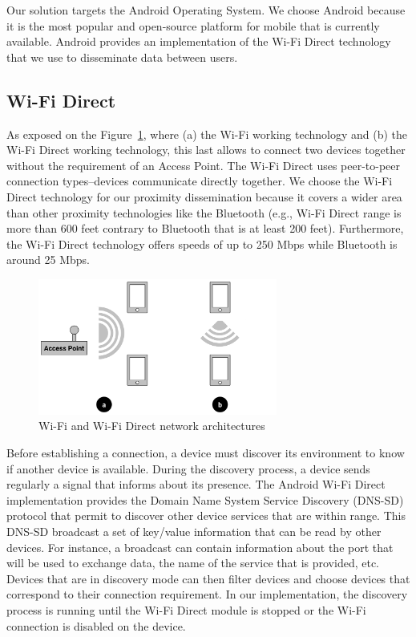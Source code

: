 

Our solution targets the Android Operating System.
We choose Android because it is the most popular and open-source platform for mobile that is currently available.
Android provides an implementation of the Wi-Fi Direct technology that we use to disseminate data between users.

\subsection{Wi-Fi Direct}

As exposed on the Figure~\ref{WiFiVsWiFiDi}, where (a) the Wi-Fi working technology and (b) the Wi-Fi Direct working technology, this last allows to connect two devices together without the requirement of an Access Point.
The Wi-Fi Direct uses peer-to-peer connection types--devices communicate directly together.
We choose the Wi-Fi Direct technology for our proximity dissemination because it covers a wider area than other proximity technologies like the Bluetooth (e.g., Wi-Fi Direct range is more than 600 feet contrary to Bluetooth that is at least 200 feet).
Furthermore, the Wi-Fi Direct technology offers speeds of up to 250 Mbps while Bluetooth is around 25 Mbps.

\begin{figure}[h]
	\centering
	\includegraphics[width=0.7\textwidth]{figures/wifivswifidirect}
	\caption{\label{WiFiVsWiFiDi}Wi-Fi and Wi-Fi Direct network architectures}
\end{figure}

Before establishing a connection, a device must discover its environment to know if another device is available.
During the discovery process, a device sends regularly a signal that informs about its presence.
The Android Wi-Fi Direct implementation provides the Domain Name System Service Discovery (DNS-SD) protocol that permit to discover other device services that are within range.
This DNS-SD broadcast a set of key/value information that can be read by other devices.
For instance, a broadcast can contain information about the port that will be used to exchange data, the name of the service that is provided, etc.
Devices that are in discovery mode can then filter devices and choose devices that correspond to their connection requirement.
In our implementation, the discovery process is running until the Wi-Fi Direct module is stopped or the Wi-Fi connection is disabled on the device.
\\

